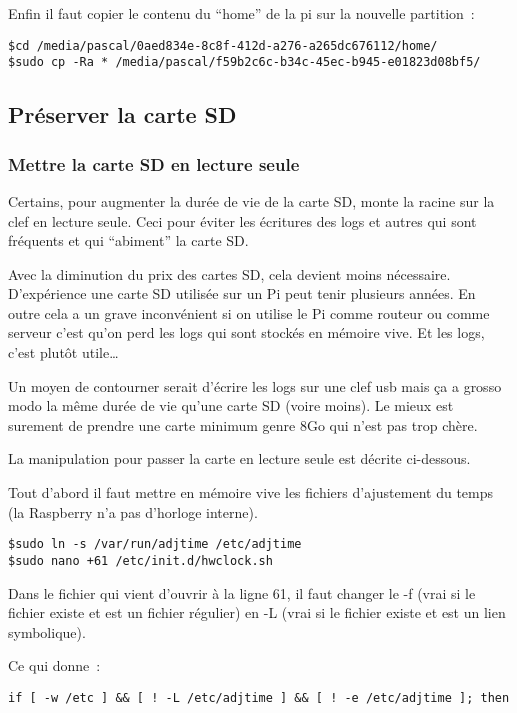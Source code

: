 Enfin il faut copier le contenu du ``home'' de la pi sur la nouvelle partition~:

\begin{verbatim}
$cd /media/pascal/0aed834e-8c8f-412d-a276-a265dc676112/home/
$sudo cp -Ra * /media/pascal/f59b2c6c-b34c-45ec-b945-e01823d08bf5/
\end{verbatim}

\subsection{Préserver la carte SD}

\subsubsection{Mettre la carte SD en lecture seule}
Certains, pour augmenter la durée de vie de la carte SD, monte la racine sur la clef en lecture seule. Ceci pour éviter les écritures des logs et autres qui sont fréquents et qui ``abiment'' la carte SD. 

Avec la diminution du prix des cartes SD, cela devient moins nécessaire. D'expérience une carte SD utilisée sur un Pi peut tenir plusieurs années. En outre cela a un grave inconvénient si on utilise le Pi comme routeur ou comme serveur c'est qu'on perd les logs qui sont stockés en mémoire vive. Et les logs, c'est plutôt utile\dots

Un moyen de contourner serait d'écrire les logs sur une clef usb mais ça a grosso modo la même durée de vie qu'une carte SD (voire moins). Le mieux est surement de prendre une carte minimum genre 8Go qui n'est pas trop chère.

La manipulation pour passer la carte en lecture seule est décrite ci-dessous. 

Tout d'abord il faut mettre en mémoire vive les fichiers d'ajustement du temps (la Raspberry n'a pas d'horloge interne).

\begin{verbatim}
$sudo ln -s /var/run/adjtime /etc/adjtime
$sudo nano +61 /etc/init.d/hwclock.sh
\end{verbatim}

Dans le fichier qui vient d'ouvrir à la ligne  61, il faut changer le -f (vrai si le fichier existe et est un fichier régulier) en -L (vrai si le fichier existe et est un lien symbolique).

Ce qui donne~:
\begin{verbatim}
if [ -w /etc ] && [ ! -L /etc/adjtime ] && [ ! -e /etc/adjtime ]; then
\end{verbatim}

